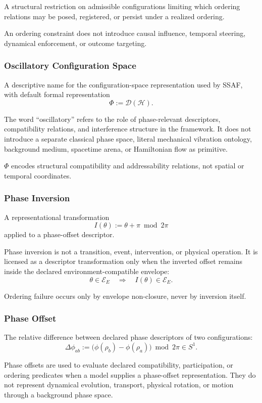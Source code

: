 \documentclass[aps,prx,onecolumn,11pt]{revtex4-2}
\theoremstyle{plain}
\theoremstyle{definition}
\theoremstyle{remark}
\begin{document}
A structural restriction on admissible configurations limiting which
ordering relations may be posed, registered, or persist under a
realized ordering.

An ordering constraint does not introduce causal influence, temporal
steering, dynamical enforcement, or outcome targeting.

\subsubsection*{Oscillatory Configuration Space}

A descriptive name for the configuration-space representation used by
SSAF, with default formal representation
\[
\Phi:=\mathcal D(\mathcal H).
\]

The word ``oscillatory'' refers to the role of phase-relevant
descriptors, compatibility relations, and interference structure in the
framework. It does not introduce a separate classical phase space,
literal mechanical vibration ontology, background medium, spacetime
arena, or Hamiltonian flow as primitive.

\(\Phi\) encodes structural compatibility and addressability relations,
not spatial or temporal coordinates.

\subsubsection*{Phase Inversion}

A representational transformation
\[
I(\theta):=\theta+\pi \bmod 2\pi
\]
applied to a phase-offset descriptor.

Phase inversion is not a transition, event, intervention, or physical
operation. It is licensed as a descriptor transformation only when the
inverted offset remains inside the declared environment-compatible
envelope:
\[
\theta\in\mathcal E_E
\quad\Longrightarrow\quad
I(\theta)\in\mathcal E_E.
\]

Ordering failure occurs only by envelope non-closure, never by
inversion itself.

\subsubsection*{Phase Offset}

The relative difference between declared phase descriptors of two
configurations:
\[
\Delta\phi_{ab}
:=
\bigl(\phi(\rho_b)-\phi(\rho_a)\bigr)\bmod 2\pi
\in S^1.
\]

Phase offsets are used to evaluate declared compatibility,
participation, or ordering predicates when a model supplies a
phase-offset representation. They do not represent dynamical evolution,
transport, physical rotation, or motion through a background phase
space.
\end{document}
